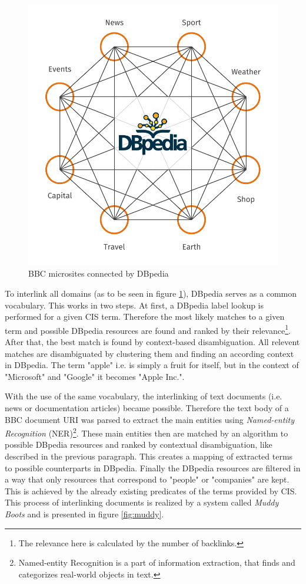 \documentclass{llncs}
\begin{document}
\begin{figure}[!h]
  \centering
  \includegraphics[width=.75\textwidth]{images/dbpedia_dark}
  \caption{BBC microsites connected by DBpedia}
  \label{fig:dbpedia}
\end{figure}

To interlink all domains (as to be seen in figure \ref{fig:dbpedia}), DBpedia serves as a common vocabulary. This works in two steps. At first, a DBpedia label lookup is performed for a given CIS term. Therefore the most likely matches to a given term and possible DBpedia resources are found and ranked by their relevance\footnote{The relevance here is calculated by the number of backlinks.}. After that, the best match is found by context-based disambiguation. All relevent matches are disambiguated by clustering them and finding an according context in DBpedia. The term "apple" i.e. is simply a fruit for itself, but in the context of "Microsoft" and "Google" it becomes "Apple Inc.".

With the use of the same vocabulary, the interlinking of text documents (i.e. news or documentation articles) became possible. Therefore the text body of a BBC document URI was parsed to extract the main entities using \textit{Named-entity Recognition} (NER)\footnote{Named-entity Recognition is a part of information extraction, that finds and categorizes real-world objects in text.}. These main entities then are matched by an algorithm to possible DBpedia resources and ranked by contextual disambiguation, like described in the previous paragraph. This creates a mapping of extracted terms to possible counterparts in DBpedia. Finally the DBpedia resources are filtered in a way that only resources that correspond to "people" or "companies" are kept. This is achieved by the already existing predicates of the terms provided by CIS. This process of interlinking documents is realized by a system called \textit{Muddy Boots} and is presented in figure \ref{fig:muddy}.
\end{document}
